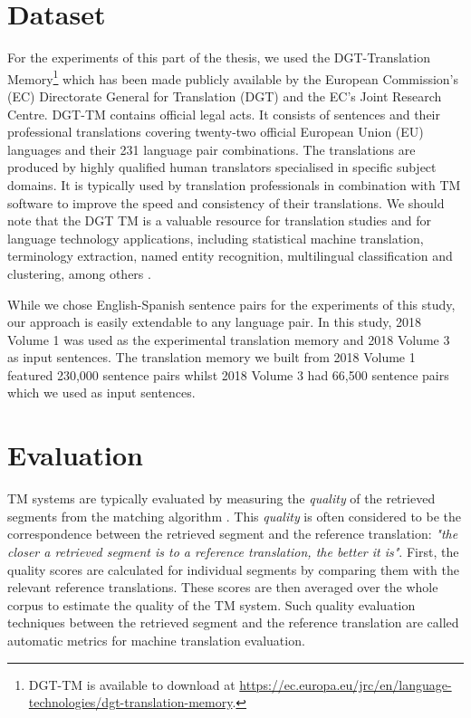 \section{Dataset}
\label{sec:tm_data}
For the experiments of this part of the thesis, we used the DGT-Translation Memory\footnote{DGT-TM is available to download at \url{https://ec.europa.eu/jrc/en/language-technologies/dgt-translation-memory}.} which has been made publicly available by the European Commission’s (EC) Directorate General for Translation (DGT) and the EC’s Joint Research Centre. DGT-TM contains official legal acts. It consists of sentences and their professional translations covering twenty-two official European Union (EU) languages and their 231 language pair combinations. The translations are produced by highly qualified human translators specialised in specific subject domains. It is typically used by translation professionals in combination with TM software to improve the speed and consistency of their translations. We should note that the DGT TM is a valuable resource for translation studies and for language technology applications, including statistical machine translation, terminology extraction, named entity recognition, multilingual classification and clustering, among others \autocite{aker-etal-2013-extracting, besacier-schwartz-2015-automated}. 

While we chose English-Spanish sentence pairs for the experiments of this study, our approach is easily extendable to any language pair. In this study, 2018 Volume 1 was used as the experimental translation memory and 2018 Volume 3 as input sentences. The translation memory we built from 2018 Volume 1 featured 230,000 sentence pairs whilst 2018 Volume 3 had 66,500 sentence pairs which we used as input sentences. 

\section{Evaluation}
\label{sec:tm_eval}
TM systems are typically evaluated by measuring the \textit{quality} of the retrieved segments from the matching algorithm \autocite{gupta-etal-2015-translation}. This \textit{quality} is often considered to be the correspondence between the retrieved segment and the reference translation: \textit{"the closer a retrieved segment is to a reference translation, the better it is"}. First, the quality scores are calculated for individual segments by comparing them with the relevant reference translations.  These scores are then averaged over the whole corpus to estimate the quality of the TM system. Such quality evaluation techniques between the retrieved segment and the reference translation are called automatic metrics for machine translation evaluation.

